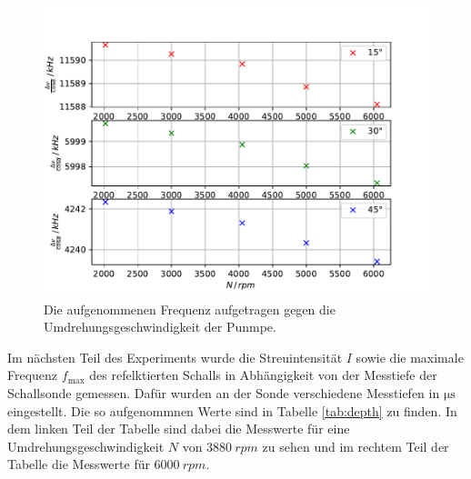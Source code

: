 \begin{figure}
    \centering
    \includegraphics[width=\textwidth]{content/data/doppler.pdf}
    \caption{Die aufgenommenen Frequenz aufgetragen gegen die Umdrehungsgeschwindigkeit der Punmpe.}
    \label{fig:doppler}
\end{figure}

\FloatBarrier

Im nächsten Teil des Experiments wurde die Streuintensität $I$ sowie die maximale Frequenz $f_\text{max}$ des refelktierten Schalls in Abhängigkeit von der Messtiefe der Schallsonde gemessen.
Dafür wurden an der Sonde verschiedene Messtiefen in $\si{\micro\second}$ eingestellt.
Die so aufgenommnen Werte sind in Tabelle \ref{tab:depth} zu finden.
In dem linken Teil der Tabelle sind dabei die Messwerte für eine Umdrehungsgeschwindigkeit $N$ von $\SI{3880}{rpm}$ zu sehen und im rechtem Teil der Tabelle die Messwerte für $\SI{6000}{rpm}$.

